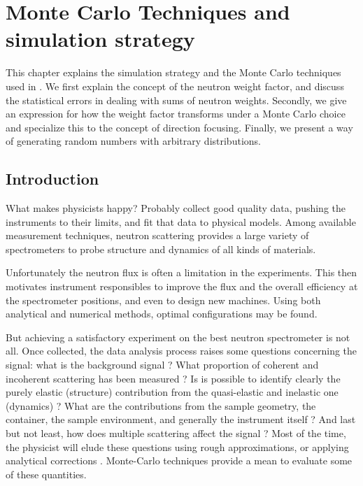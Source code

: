 
\chapter{Monte Carlo Techniques and simulation strategy}
\label{s:MCtechniques}

This chapter explains the simulation strategy and the Monte Carlo
techniques used in \MCS. We first explain the concept of the neutron
weight factor, and discuss the statistical errors in dealing with sums
of neutron weights.  Secondly, we give an expression for how the weight
factor transforms under a Monte Carlo choice and specialize this
to the concept of direction focusing.  Finally, we present a way of
generating random numbers with arbitrary distributions.

\section{Introduction}
What makes physicists happy? Probably collect good quality data, pushing the instruments to their limits, and fit that data to physical models.
Among available measurement techniques, neutron scattering provides a large variety of spectrometers to probe structure and dynamics of all kinds of materials.

Unfortunately the neutron flux is often a limitation in the experiments. This then motivates instrument responsibles to improve the flux and the overall efficiency at the spectrometer positions, and even to design new machines. Using both analytical and numerical methods, optimal configurations may be found.

But achieving a satisfactory experiment on the best neutron spectrometer is not all. Once collected, the data analysis process raises some questions concerning the signal: what is the background signal ? What proportion of coherent and incoherent scattering has been measured ? Is is possible to identify clearly the purely elastic (structure) contribution from the quasi-elastic and inelastic one (dynamics) ? What are the contributions from the sample geometry, the container, the sample environment, and generally the instrument itself ? And last but not least, how does multiple scattering affect the signal ? Most of the time, the physicist will elude these questions using rough approximations, or applying analytical corrections \cite{Copley86}. Monte-Carlo techniques provide a mean to evaluate some of these quantities.

